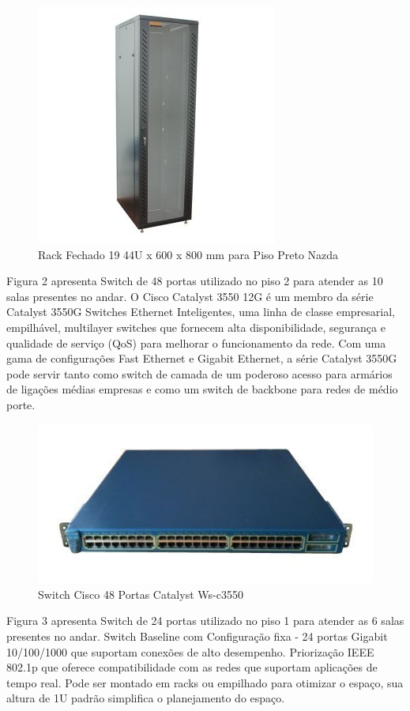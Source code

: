 \documentclass[	DIV=calc,%
							paper=a4,%
							fontsize=12pt,%
							onecolumn]{scrartcl}	 					%
\begin{document}
\begin{figure}
\centering
\includegraphics[]{rack}
\caption{Rack Fechado 19 44U x 600 x 800 mm para Piso Preto Nazda }
\label{fig1}
\end{figure}


Figura 2 apresenta Switch de 48 portas utilizado no piso 2 para atender as 10 salas presentes no andar.
O Cisco Catalyst 3550 12G é um membro da série Catalyst 3550G Switches Ethernet Inteligentes, uma linha de classe empresarial, empilhável, multilayer switches que fornecem alta disponibilidade, segurança e qualidade de serviço (QoS) para melhorar o funcionamento da rede. Com uma gama de configurações Fast Ethernet e Gigabit Ethernet, a série Catalyst 3550G pode servir tanto como switch de camada de um poderoso acesso para armários de ligações médias empresas e como um switch de backbone para redes de médio porte.

\begin{figure}
	\centering
	\includegraphics[]{sw48}
	\caption{Switch Cisco 48 Portas Catalyst Ws-c3550}
	\label{fig2}
\end{figure}


Figura 3 apresenta Switch de 24 portas utilizado no piso 1 para atender as 6 salas presentes no andar.
Switch Baseline com Configuração fixa - 24 portas Gigabit 10/100/1000 que suportam conexões de alto desempenho.
Priorização IEEE 802.1p que oferece compatibilidade com as redes que suportam aplicações de tempo real.
Pode ser montado em racks ou empilhado para otimizar o espaço, sua altura de 1U padrão simplifica o planejamento do espaço.
\end{document}
